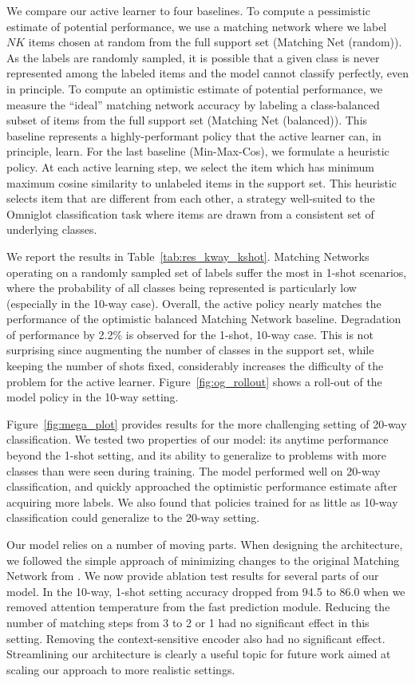 We compare our active learner to four baselines. To compute a pessimistic estimate of potential performance, we use a matching network where we label $NK$ items chosen at random from the full support set (Matching Net (random)). As the labels are randomly sampled, it is possible that a given class is never represented among the labeled items and the model cannot classify perfectly, even in principle. To compute an optimistic estimate of potential performance, we measure the ``ideal'' matching network accuracy by labeling a class-balanced subset of items from the full support set (Matching Net (balanced)). This baseline represents a highly-performant policy that the active learner can, in principle, learn. For the last baseline (Min-Max-Cos), we formulate a heuristic policy. At each active learning step, we select the item which has minimum maximum cosine similarity to unlabeled items in the support set. This heuristic selects item that are different from each other, a strategy well-suited to the Omniglot classification task where items are drawn from a consistent set of underlying classes.

We report the results in Table~\ref{tab:res_kway_kshot}. Matching Networks operating on a randomly sampled set of labels suffer the most in 1-shot scenarios, where the probability of all classes being represented is particularly low (especially in the 10-way case). Overall, the active policy nearly matches the performance of the optimistic balanced Matching Network baseline. Degradation of performance by 2.2\% is observed for the 1-shot, 10-way case. This is not surprising since augmenting the number of classes in the support set, while keeping the number of shots fixed, considerably increases the difficulty of the problem for the active learner.
Figure~\ref{fig:og_rollout} shows a roll-out of the model policy in the 10-way setting.

Figure~\ref{fig:mega_plot} provides results for the more challenging setting of 20-way classification. We tested two properties of our model: its anytime performance beyond the 1-shot setting, and its ability to generalize to problems with more classes than were seen during training. The model performed well on 20-way classification, and quickly approached the optimistic performance estimate after acquiring more labels. We also found that policies trained for as little as 10-way classification could generalize to the 20-way setting.

Our model relies on a number of moving parts. When designing the architecture, we followed the simple approach of minimizing changes to the original Matching Network from \citet{vinyals2016matching}. We now provide ablation test results for several parts of our model. In the 10-way, 1-shot setting accuracy dropped from 94.5 to 86.0 when we removed attention temperature from the fast prediction module. Reducing the number of matching steps from 3 to 2 or 1 had no significant effect in this setting. Removing the context-sensitive encoder also had no significant effect. Streamlining our architecture is clearly a useful topic for future work aimed at scaling our approach to more realistic settings.

